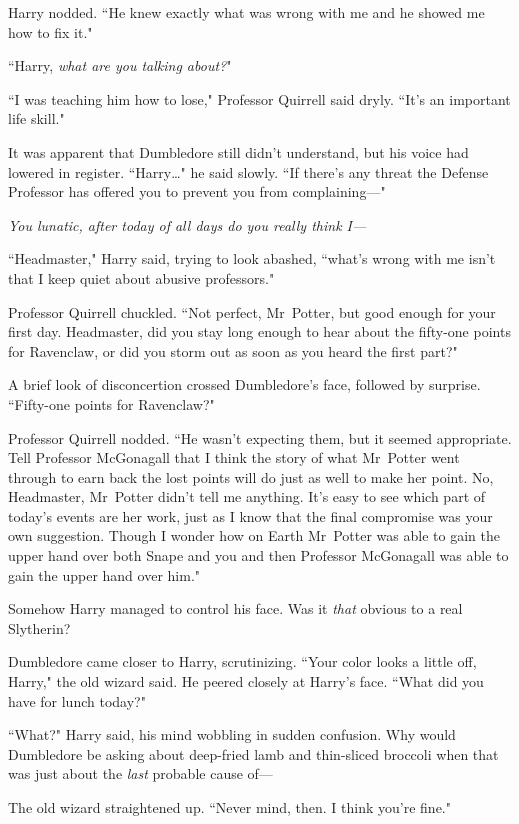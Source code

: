 Harry nodded. ``He knew exactly what was wrong with me and he showed me how to fix it."

``Harry, \emph{what are you talking about?}"

``I was teaching him how to lose," Professor Quirrell said dryly. ``It's an important life skill."

It was apparent that Dumbledore still didn't understand, but his voice had lowered in register. ``Harry{\ldots}" he said slowly. ``If there's any threat the Defense Professor has offered you to prevent you from complaining—"

\emph{You lunatic, after today of all days do you really think I—}

``Headmaster," Harry said, trying to look abashed, ``what's wrong with me isn't that I keep quiet about abusive professors."

Professor Quirrell chuckled. ``Not perfect, Mr~Potter, but good enough for your first day. Headmaster, did you stay long enough to hear about the fifty-one points for Ravenclaw, or did you storm out as soon as you heard the first part?"

A brief look of disconcertion crossed Dumbledore's face, followed by surprise. ``Fifty-one points for Ravenclaw?"

Professor Quirrell nodded. ``He wasn't expecting them, but it seemed appropriate. Tell Professor McGonagall that I think the story of what Mr~Potter went through to earn back the lost points will do just as well to make her point. No, Headmaster, Mr~Potter didn't tell me anything. It's easy to see which part of today's events are her work, just as I know that the final compromise was your own suggestion. Though I wonder how on Earth Mr~Potter was able to gain the upper hand over both Snape and you and then Professor McGonagall was able to gain the upper hand over him."

Somehow Harry managed to control his face. Was it \emph{that} obvious to a real Slytherin?

Dumbledore came closer to Harry, scrutinizing. ``Your color looks a little off, Harry," the old wizard said. He peered closely at Harry's face. ``What did you have for lunch today?"

``What?" Harry said, his mind wobbling in sudden confusion. Why would Dumbledore be asking about deep-fried lamb and thin-sliced broccoli when that was just about the \emph{last} probable cause of—

The old wizard straightened up. ``Never mind, then. I think you're fine."

